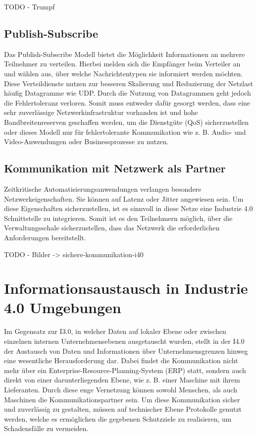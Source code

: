 TODO - Trumpf

\subsection{Publish-Subscribe}
Das Publish-Subscribe Modell bietet die Möglichkeit Informationen an mehrere Teilnehmer zu verteilen. Hierbei melden sich die Empfänger beim Verteiler an und wählen aus, über welche Nachrichtentypen sie informiert werden möchten. Diese Verteildienste nutzen zur besseren Skalierung und Reduzierung der Netzlast häufig Datagramme wie \ac{UDP}. Durch die Nutzung von Datagrammen geht jedoch die Fehlertoleranz verloren. Somit muss entweder dafür gesorgt werden, dass eine sehr zuverlässige Netzwerkinfrastruktur vorhanden ist und hohe Bandbreitenreserven geschaffen werden, um die Dienstgüte (\ac{QoS}) sicherzustellen oder dieses Modell nur für fehlertolerante Kommunikation wie z. B. Audio- und Video-Anwendungen oder Businessprozesse zu nutzen. 

\subsection{Kommunikation mit Netzwerk als Partner}
Zeitkritische Automatisierungsanwendungen verlangen besondere Netzwerkeigenschaften. Sie können auf Latenz oder Jitter angewiesen sein. Um diese Eigenschaften sicherzustellen, ist es sinnvoll in diese Netze eine Industrie 4.0 Schnittstelle zu integrieren. Somit ist es den Teilnehmern möglich, über die Verwaltungsschale sicherzustellen, dass das Netzwerk die erforderlichen Anforderungen bereitstellt. \cite{sichKom2017}

TODO - Bilder -> sichere-kommunikation-i40

\section{Informationsaustausch in Industrie 4.0 Umgebungen}
Im Gegensatz zur I3.0, in welcher Daten auf lokaler Ebene oder zwischen einzelnen internen Unternehmensebenen ausgetauscht wurden, stellt in der I4.0 der Austausch von Daten und Informationen über Unternehmensgrenzen hinweg eine wesentliche Herausforderung dar. Dabei findet die Kommunikation nicht mehr über ein Enterprise-Resource-Planning-System (ERP) statt, sondern auch direkt von einer darunterliegenden Ebene, wie z. B. einer Maschine mit ihrem Lieferanten. Durch diese enge Vernetzung können sowohl Menschen, als auch Maschinen die Kommunikationspartner sein. Um diese Kommunikation sicher und zuverlässig zu gestalten, müssen auf technischer Ebene Protokolle genutzt werden, welche es ermöglichen die gegebenen Schutzziele zu realisieren, um Schadensfälle zu vermeiden. 

